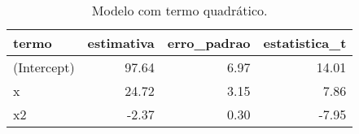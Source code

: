 \begin{table}

\caption{\label{tab:tabela_hetero}Modelo com termo quadrático.}
\centering
\begin{tabular}[t]{l|r|r|r}
\hline
termo & estimativa & erro\_padrao & estatistica\_t\\
\hline
(Intercept) & 97.64 & 6.97 & 14.01\\
\hline
x & 24.72 & 3.15 & 7.86\\
\hline
x2 & -2.37 & 0.30 & -7.95\\
\hline
\end{tabular}
\end{table}
